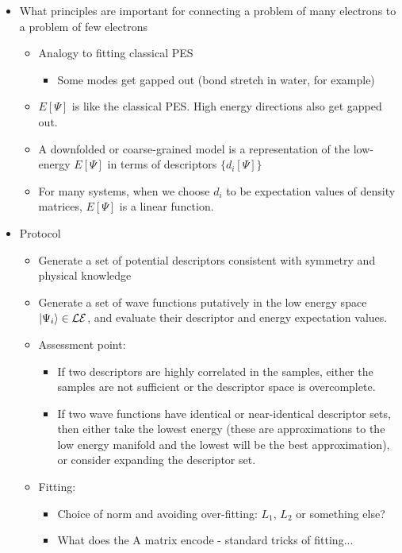 \documentclass[prl,12pt,onecolumn,nofootinbib,notitlepage,english,superscriptaddress]{revtex4-1}
\newcommand{\lucas}[1]{{\color{GREEN}{\bf LKW: #1}}}
\begin{document}
 
\begin{itemize}
\item What principles are important for connecting a problem of many electrons to a problem of few electrons
 \begin{itemize}
\item Analogy to fitting classical PES
    \begin{itemize}
    \item Some modes get gapped out (bond stretch in water, for example)
    \end{itemize}
\item $E[\Psi]$ is like the classical PES. High energy directions also get gapped out. 
\item A downfolded or coarse-grained model is a representation of the low-energy $E[\Psi]$ in terms of descriptors $\{d_i[\Psi]\}$
\item For many systems, when we choose $d_i$ to be expectation values of density matrices, $E[\Psi]$ is a linear function.
\end{itemize}


	
\item Protocol \lucas{this overlaps a little with 'Fitting procedure'; we should discuss how to merge/cut them. We will also probably want a graphic.} 
   \begin{itemize}
   \item Generate a set of potential descriptors consistent with symmetry and physical knowledge
   \item Generate a set of wave functions putatively in the low energy space $|\Psi_i\rangle \in {\cal LE} $, and evaluate their descriptor and energy expectation values.
   \item Assessment point: 
      \begin{itemize}
      \item If two descriptors are highly correlated in the samples, either the samples are not sufficient or the descriptor space is overcomplete.
      \item If two wave functions have identical or near-identical descriptor sets, then either take the lowest energy (these are approximations to the low energy manifold and the lowest will be the best approximation), or consider expanding the descriptor set.
      \end{itemize}
   \item Fitting: 
      	\begin{itemize}
      	\item Choice of norm and avoiding over-fitting: $L_1$, $L_2$ or something else? 
      	\item What does the A matrix encode - standard tricks of fitting...
	\end{itemize}


\end{itemize}
\end{itemize}
\end{document}
